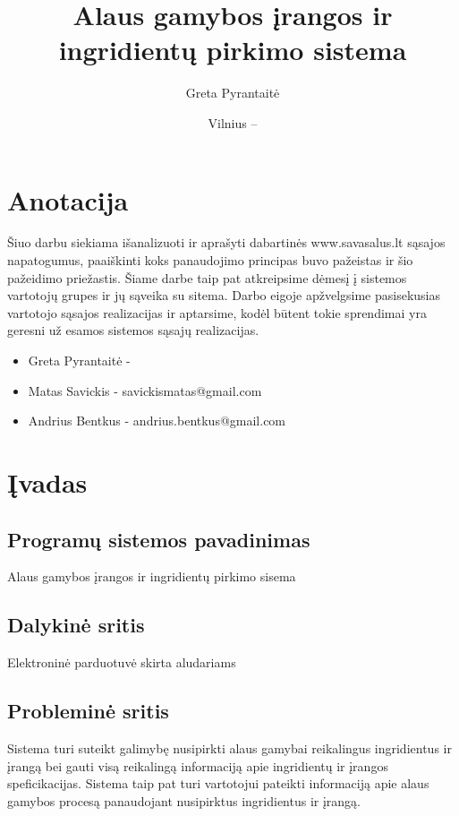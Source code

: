 \documentclass[oneside]{VUMIFPSkursinis}
\title{Alaus gamybos įrangos ir ingridientų pirkimo sistema}
\author{Greta Pyrantaitė}
\date{Vilnius – \the\year}
\begin{document}
\maketitle

\section{Anotacija}
Šiuo darbu siekiama išanalizuoti ir aprašyti dabartinės www.savasalus.lt sąsajos napatogumus, paaiškinti koks panaudojimo principas buvo pažeistas ir šio pažeidimo priežastis.
Šiame darbe taip pat atkreipsime dėmesį į sistemos vartotojų grupes ir jų sąveika su sitema.
Darbo eigoje apžvelgsime pasisekusias vartotojo sąsajos realizacijas ir aptarsime, kodėl būtent tokie sprendimai yra geresni už esamos sistemos sąsajų realizacijas.

\begin{itemize}
	\item{Greta Pyrantaitė - }
	\item{Matas Savickis - savickismatas@gmail.com}
	\item{Andrius Bentkus - andrius.bentkus@gmail.com}
\end{itemize}

\tableofcontents

\section{Įvadas}
	\subsection{Programų sistemos pavadinimas}
		Alaus gamybos įrangos ir ingridientų pirkimo sisema
	\subsection{Dalykinė sritis}
		Elektroninė parduotuvė skirta aludariams
	\subsection{Probleminė sritis}
		Sistema turi suteikt galimybę nusipirkti alaus gamybai reikalingus ingridientus ir įrangą bei gauti visą reikalingą informaciją apie ingridientų ir įrangos speficikacijas.
		Sistema taip pat turi vartotojui pateikti informaciją apie alaus gamybos procesą panaudojant nusipirktus ingridientus ir įrangą.
\end{document}
